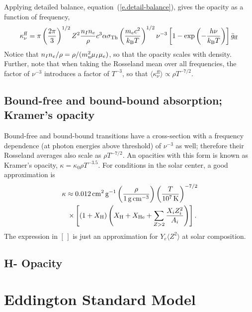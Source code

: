 Applying detailed balance, equation~(\ref{e.detail-balance}), gives the opacity as a function of frequency,
\begin{equation}\label{e.free-free-opacity}
\kappa^{\mathrm{ff}}_{\nu} = \pi\left(\frac{2\pi}{3}\right)^{1/2}Z^{2}\frac{n_{I}n_{e}}{\rho}c^{3}\alpha \sigma_{\mathrm{Th}} \left(\frac{m_{e}c^{2}}{k_\mathrm{B} T}\right)^{1/2} \nu^{-3} \left[ 1- \exp\left(-\frac{h\nu}{k_\mathrm{B} T}\right)  \right] \bar{g}_{\mathrm{ff}}
\end{equation}
Notice that $n_{I}n_{e}/\rho = \rho/(m_\mathrm{u}^{2}\mu_{I}\mu_{e})$, so that the opacity scales with density.  Further, note that when taking the Rosseland mean over all frequencies, the factor of $\nu^{-3}$ introduces a factor of $T^{-3}$, so that $\langle\kappa^{\mathrm{ff}}_{\nu}\rangle \propto \rho T^{-7/2}$.

\subsection{Bound-free and bound-bound absorption; Kramer's opacity}
Bound-free and bound-bound transitions have a cross-section with a frequency dependence (at photon energies above threshold) of $\nu^{-3}$ as well; therefore their Rosseland averages also scale as $\rho T^{-7/2}$.  An opacities with this form is known as {Kramer's opacity}, $\kappa = \kappa_{0}\rho T^{-3.5}$.  For conditions in the solar center, a good approximation is
\begin{eqnarray}
\lefteqn{\kappa \approx 0.012\nsp\cm^{2}\usp\gram^{-1}\left(\frac{\rho}{1\nsp\grampercc}\right) \left(\frac{T}{10^{7}\nsp\K}\right)^{-7/2}} \nonumber\\
&& \times\left[\left(1+X_{\mathrm{H}}\right)\left(X_{\mathrm{H}} + X_{\mathrm{He}} + \sum_{Z>2}\frac{X_{i}Z_{i}^{2}}{A_{i}}\right)\right].
\label{e.kramers-opacity}
\end{eqnarray}
The expression in $[\,]$ is just an approximation for $Y_{e}\langle Z^{2}\rangle$ at solar composition.

\subsection{H- Opacity}

\section{Eddington Standard Model}\label{s.LE-Eddington-Standard-Model}

